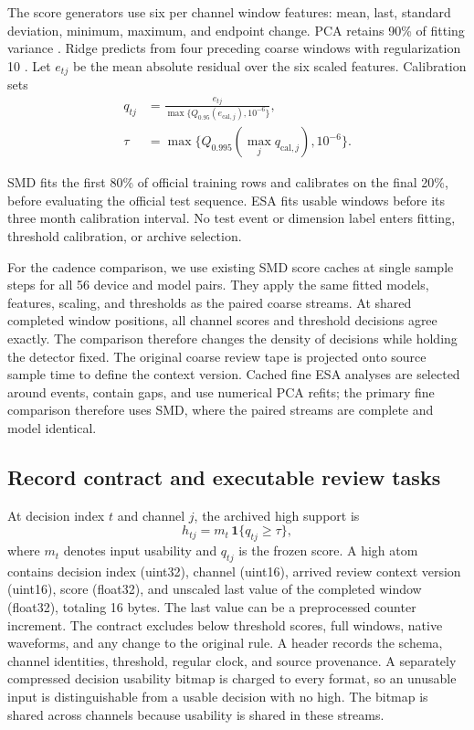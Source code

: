 \documentclass[a4paper,fleqn]{cas-dc}
\begin{document}
The score generators use six per channel window features: mean, last, standard deviation, minimum, maximum, and endpoint change. PCA retains 90\% of fitting variance \cite{Jolliffe2016PCA}. Ridge predicts from four preceding coarse windows with regularization 10 \cite{Hoerl1970Ridge}. Let $e_{tj}$ be the mean absolute residual over the six scaled features. Calibration sets
\begin{equation}\label{eq:calib}
\begin{aligned}
q_{tj}&=\frac{e_{tj}}{\max\{Q_{0.95}(e_{\mathrm{cal},j}),10^{-6}\}},\\
\tau&=\max\{Q_{0.995}(\max_j q_{\mathrm{cal},j}),10^{-6}\}.
\end{aligned}
\end{equation}

SMD fits the first 80\% of official training rows and calibrates on the final 20\%, before evaluating the official test sequence. ESA fits usable windows before its three month calibration interval. No test event or dimension label enters fitting, threshold calibration, or archive selection.

For the cadence comparison, we use existing SMD score caches at single sample steps for all 56 device and model pairs. They apply the same fitted models, features, scaling, and thresholds as the paired coarse streams. At shared completed window positions, all channel scores and threshold decisions agree exactly. The comparison therefore changes the density of decisions while holding the detector fixed. The original coarse review tape is projected onto source sample time to define the context version. Cached fine ESA analyses are selected around events, contain gaps, and use numerical PCA refits; the primary fine comparison therefore uses SMD, where the paired streams are complete and model identical.

\subsection{Record contract and executable review tasks}

At decision index $t$ and channel $j$, the archived high support is
\begin{equation}\label{eq:support}
h_{tj}=m_t\,\mathbf{1}\{q_{tj}\geq\tau\},
\end{equation}
where $m_t$ denotes input usability and $q_{tj}$ is the frozen score. A high atom contains decision index (uint32), channel (uint16), arrived review context version (uint16), score (float32), and unscaled last value of the completed window (float32), totaling 16 bytes. The last value can be a preprocessed counter increment. The contract excludes below threshold scores, full windows, native waveforms, and any change to the original rule. A header records the schema, channel identities, threshold, regular clock, and source provenance. A separately compressed decision usability bitmap is charged to every format, so an unusable input is distinguishable from a usable decision with no high. The bitmap is shared across channels because usability is shared in these streams.
\end{document}
